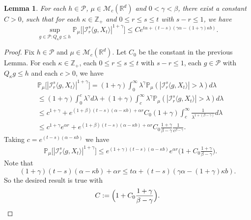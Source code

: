 \documentclass[12pt]{amsart}
\theoremstyle{plain}
\newtheorem{lem}[thm]{Lemma}
\theoremstyle{definition}
\numberwithin{equation}{section}
\begin{document}
\begin{lem}
\label{lem: control of mgtrs}
	For each $h \in \mathcal P$, $\mu \in \mathcal M_c(\mathbb{R}^d)$ and $0<\gamma < \beta$, there exist a constant $C > 0$, such that for each $\kappa \in \mathbb Z_+$ and $0\leq r\leq s\leq t$ with $s-r \leq 1$, we have
\[
    \sup_{g \in \mathcal P: Q_\kappa g\leq h} \mathbb P_\mu\big[|\mathcal I_r^s\langle g, X_t\rangle|^{1+\gamma}\big]
    \leq C e^{t\alpha+(t-s) (\gamma\alpha- (1+\gamma)\kappa b)}.
\]
\end{lem}

\begin{proof}
	Fix $h \in \mathcal P$ and $\mu \in \mathcal M_c(\mathbb R^d)$. Let $C_0$ be the constant in the previous Lemma.
    For each $\kappa \in \mathbb Z_+$, each $0\leq r\leq s\leq t$ with $s-r \leq 1$, each $g\in \mathcal P$ with $Q_{\kappa} g \leq h$ and each $c>0$, we have
\begin{align}
    &\mathbb P_\mu\big[|\mathcal I_r^s\langle g, X_t\rangle|^{1+\gamma}\big]
    = (1+\gamma)\int_0^\infty \lambda^{\gamma} \mathbb P_{\mu}(|\mathcal I_r^s\langle g, X_t\rangle|>\lambda) d\lambda
    \\&\leq (1+\gamma)\int_0^c \lambda^{\gamma} d\lambda +(1+\gamma)\int_c^\infty \lambda^{\gamma}\mathbb P_\mu(|\mathcal I_r^s\langle g, X_t\rangle|> \lambda) d\lambda
    \\& \leq c^{1+\gamma} + e^{(1+\beta)(t-s)(\alpha- \kappa b) + \alpha r} C_0  (1+\gamma)\int_c^\infty \frac{1}{\lambda^{1+(\beta-\gamma)}}d\lambda
    \\&\leq c^{1+\gamma} e^{\alpha r} + e^{(1+\beta)(t-s)(\alpha- \kappa b) + \alpha r} C_0   \frac{1+\gamma}{\beta - \gamma} \frac{1}{c^{\beta - \gamma}}.
\end{align}
    Taking $c = e^{(t-s)(\alpha- \kappa b)}$ we have
\begin{align}
    &\mathbb P_\mu\big[|\mathcal I_r^s\langle g, X_t\rangle|^{1+\gamma}\big]
    \leq e^{(1+\gamma)(t-s)(\alpha- \kappa b)} e^{\alpha r}\Big(1+ C_0 \frac{1+\gamma}{\beta - \gamma}\Big).
\end{align}
    Note that
\[
    (1+\gamma)(t-s)(\alpha- \kappa b) + \alpha r
    \leq t\alpha+(t-s) (\gamma\alpha- (1+\gamma)\kappa b).
\]
	So the desired result is true with
\[
	C := \Big(1+ C_0 \frac{1+\gamma}{\beta - \gamma}\Big).
	\qedhere
\]
\end{proof}
\end{document}
